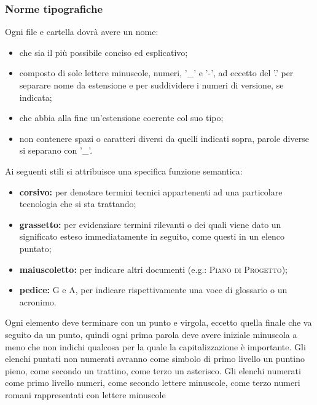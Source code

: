     \subsubsection{Norme tipografiche}
        \label{convezionenomifile}
        Ogni file e cartella dovrà avere un nome:
        \begin{itemize}
            \item che sia il più possibile conciso ed esplicativo;
            \item composto di sole lettere minuscole, numeri, '\_' e '-', ad eccetto del '.' per separare nome da estensione e per suddividere i numeri di versione, se indicata;
            \item che abbia alla fine un'estensione coerente col suo tipo;
            \item non contenere spazi o caratteri diversi da quelli indicati sopra, parole diverse si separano con '\_'.
        \end{itemize}
        Ai seguenti stili si attribuisce una specifica funzione semantica:
        \begin{itemize}
            \item \textbf{corsivo: }per denotare termini tecnici appartenenti ad una particolare tecnologia che si sta trattando;
            \item \textbf{grassetto: }per evidenziare termini rilevanti o dei quali viene dato un significato esteso immediatamente in seguito, come questi in un elenco puntato;
            \item \textbf{maiuscoletto: }per indicare altri documenti (e.g.: \textsc{Piano di Progetto});
            \item \textbf{pedice: } G e A, per indicare rispettivamente una voce di glossario o un acronimo.
        \end{itemize}
        Ogni elemento deve terminare con un punto e virgola, eccetto quella finale che va seguito da un punto, quindi ogni prima parola deve avere iniziale minuscola a meno che non indichi qualcosa per la quale la capitalizzazione è importante. Gli elenchi puntati non numerati avranno come simbolo di primo livello un puntino pieno, come secondo un trattino, come terzo un asterisco. Gli elenchi numerati come primo livello numeri, come secondo lettere minuscole, come terzo numeri romani rappresentati con lettere minuscole
